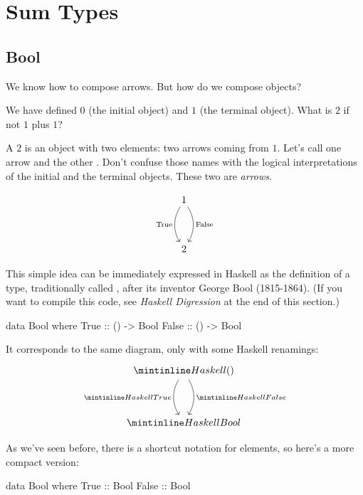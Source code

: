 \documentclass[DaoFP]{subfiles}
\begin{document}
\setcounter{chapter}{3}

\chapter{Sum Types}

\section{Bool}

We know how to compose arrows. But how do we compose objects?

 We have defined $0$ (the initial object) and $1$ (the terminal object). What is $2$ if not $1$ plus $1$?
 
A $2$ is an object with two elements: two arrows coming from $1$. Let's call one arrow  and the other . Don't confuse those names with the logical interpretations of the initial and the terminal objects. These two are \emph{arrows}. 

\[
 \begin{tikzcd}
 1
 \arrow[dd, bend right, "\text{True}"']
 \arrow[dd, bend left, "\text{False}"]
 \\
 \\
2
 \end{tikzcd}
\]

This simple idea can be immediately expressed in Haskell as the definition of a type, traditionally called , after its inventor George Bool (1815-1864). (If you want to compile this code, see \emph{Haskell Digression} at the end of this section.)

\begin{haskell}
data Bool where
  True  :: () -> Bool
  False :: () -> Bool
\end{haskell}
It corresponds to the same diagram, only with some Haskell renamings:
\[
 \begin{tikzcd}
 \hask{()}
 \arrow[dd, bend right, "\hask{True}"']
 \arrow[dd, bend left, "\hask{False}"]
 \\
 \\
\hask{Bool}
 \end{tikzcd}
\]

As we've seen before, there is a shortcut notation for elements, so here's a more compact version:

\begin{haskell}
data Bool where
  True  :: Bool
  False :: Bool
\end{haskell}
\end{document}
